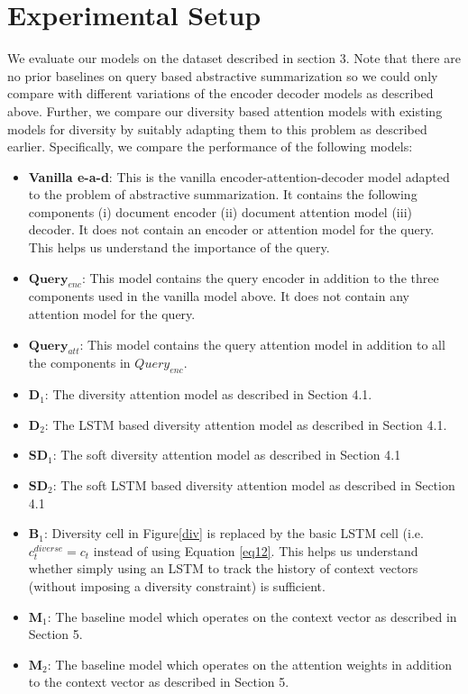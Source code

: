 \documentclass[11pt]{article}
\begin{document}
\section{Experimental Setup}
We evaluate our models on the dataset described in section 3. Note that there are no prior baselines on query based abstractive summarization so we could only compare with different variations of the encoder decoder models as described above. Further, we compare our diversity based attention models with existing models for diversity by suitably adapting them to this problem as described earlier. Specifically, we compare the performance of the following models:

\begin{itemize}
\item \textbf{Vanilla e-a-d}: This is the vanilla encoder-attention-decoder model adapted to the problem of abstractive summarization. It contains the following components (i) document encoder (ii) document attention model (iii) decoder. It does not contain an encoder or attention model for the query. This helps us understand the importance of the query.
\vspace{-0.05in}
\item \textbf{$\mathbf{Query}_{enc}$}: This model contains the query encoder in addition to the three components used in the vanilla model above. It does not contain any attention model for the query.
\vspace{-0.05in}
\item \textbf{$\mathbf{Query}_{att}$}: This model contains the query attention model in addition to all the components in $Query_{enc}$.
\vspace{-0.05in}
\item \textbf{$\mathbf{D}_1$}: The diversity attention model as described in Section 4.1.
\vspace{-0.05in}
\item \textbf{$\mathbf{D}_2$}: The LSTM based diversity attention model as described in Section 4.1.
\vspace{-0.05in}
\item \textbf{$\mathbf{SD}_1$}: The soft diversity attention model as described in Section 4.1
\vspace{-0.05in}
\item \textbf {$\mathbf{SD}_2$}: The soft LSTM based diversity attention model as described in Section 4.1
\vspace{-0.05in}
\item \textbf {$\mathbf{B}_1$}: Diversity cell in Figure\ref{div} is replaced by the basic LSTM cell (i.e. $c_t^{diverse} = c_t$ instead of using Equation \eqref{eq12}. This helps us understand whether simply using an LSTM to track the history of context vectors (without imposing a diversity constraint) is sufficient.
\vspace{-0.05in}
\item \textbf{$\mathbf{M}_1$}: The baseline model which operates on the context vector as described in Section 5.
\item \textbf{$\mathbf{M}_2$}: The baseline model which operates on the attention weights in addition to the context vector as described in Section 5.
\end{itemize}
\end{document}
